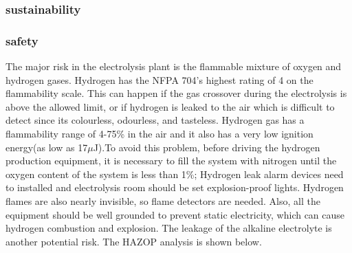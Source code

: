 \subsubsection{sustainability}
\subsubsection{safety}
The major risk in the electrolysis plant is the flammable mixture of oxygen and hydrogen gases.
Hydrogen has the NFPA 704's highest rating of 4 on the flammability scale. \cite{safety} This can happen if the gas crossover during the electrolysis is above the allowed limit, or if hydrogen is leaked to the air which is difficult to detect since its colourless, odourless, and tasteless. Hydrogen gas has a flammability range of 4-75\% in the air and it also has a very low ignition energy(as low as 17$\mu$J).To avoid this problem, 
before driving the hydrogen production equipment, it is necessary to fill the system with nitrogen until the oxygen content of the system is less than 1\%; Hydrogen leak alarm devices need to installed and electrolysis room should be set explosion-proof lights. Hydrogen flames are also nearly invisible, so flame detectors are needed. Also, all the equipment should be well grounded to prevent static electricity, which can cause hydrogen combustion and explosion. The leakage of the alkaline electrolyte is another potential risk. The HAZOP analysis is shown below.

